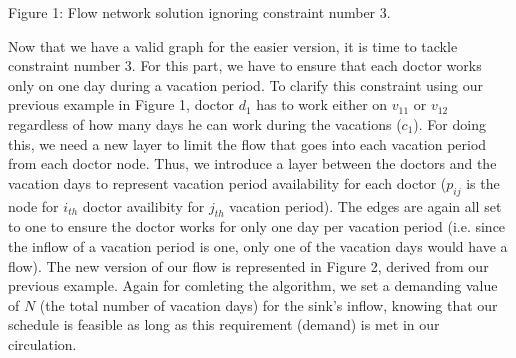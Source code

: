 \vspace*{1cm}
{\centering {} \par}
{\centering Figure 1: Flow network solution ignoring constraint number 3.\par}

Now that we have a valid graph for the easier version, it is time to tackle constraint number 3. For this part,
we have to ensure that each doctor works only on one day during a vacation period. To clarify this constraint using our previous example in Figure 1,
doctor $d_1$ has to work either on $v_{11}$ or $v_{12}$ regardless of how many days he can work during the vacations ($c_1$). For doing this, we need 
a new layer to limit the flow that goes into each vacation period from each doctor node. Thus, we introduce a layer between the doctors and the vacation days
to represent vacation period availability for each doctor ($p_{ij}$ is the node for $i_{th}$ doctor availibity for $j_{th}$ vacation period). The edges are again all set
to one to ensure the doctor works for only one day per vacation period (i.e. since the inflow of a vacation period is one, only one of the
vacation days would have a flow). The new version of our flow is represented in Figure 2, derived from our previous example. 
Again for comleting the algorithm, we set a demanding value of $N$ (the total number of vacation days) for the sink's inflow, knowing that our schedule is feasible as long as this
requirement (demand) is met in our circulation.

